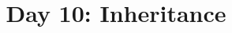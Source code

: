 \documentclass{article}
\begin{document}
\title{Day 10: Inheritance}
\author{}
\date{}
\maketitle





\end{document}
